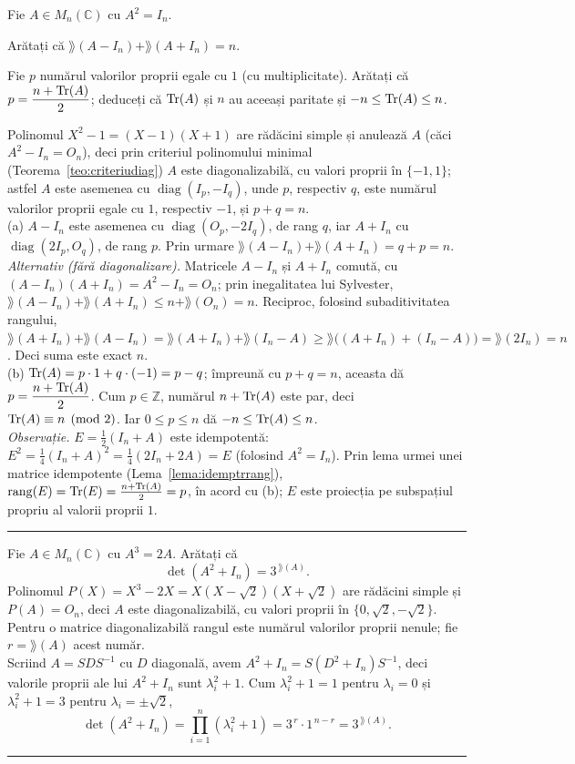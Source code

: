 Fie $A\in M_n(\mathbb{C})$ cu $A^2=I_n$.
\begin{parti}
  \item Arătați că $\rang(A-I_n)+\rang(A+I_n)=n$.
  \item Fie $p$ numărul valorilor proprii egale cu $1$ (cu multiplicitate). Arătați că $p=\dfrac{n+\operatorname{Tr}(A)}{2}$; deduceți că $\operatorname{Tr}(A)$ și $n$ au aceeași paritate și $-n\le\operatorname{Tr}(A)\le n$.
\end{parti}
\sol Polinomul $X^2-1=(X-1)(X+1)$ are rădăcini simple și anulează $A$ (căci $A^2-I_n=O_n$), deci prin criteriul polinomului minimal (Teorema~\ref{teo:criteriudiag}) $A$ este diagonalizabilă, cu valori proprii în $\{-1,1\}$; astfel $A$ este asemenea cu $\operatorname{diag}(I_p,-I_q)$, unde $p$, respectiv $q$, este numărul valorilor proprii egale cu $1$, respectiv $-1$, și $p+q=n$.\\[2pt]
(a) $A-I_n$ este asemenea cu $\operatorname{diag}(O_p,-2I_q)$, de rang $q$, iar $A+I_n$ cu $\operatorname{diag}(2I_p,O_q)$, de rang $p$. Prin urmare $\rang(A-I_n)+\rang(A+I_n)=q+p=n$.\\[2pt]
\emph{Alternativ (fără diagonalizare).} Matricele $A-I_n$ și $A+I_n$ comută, cu $(A-I_n)(A+I_n)=A^2-I_n=O_n$; prin inegalitatea lui Sylvester, $\rang(A-I_n)+\rang(A+I_n)\le n+\rang(O_n)=n$. Reciproc, folosind subaditivitatea rangului, $\rang(A+I_n)+\rang(A-I_n)=\rang(A+I_n)+\rang(I_n-A)\ge\rang\bigl((A+I_n)+(I_n-A)\bigr)=\rang(2I_n)=n$. Deci suma este exact $n$.\\[2pt]
(b) $\operatorname{Tr}(A)=p\cdot1+q\cdot(-1)=p-q$; împreună cu $p+q=n$, aceasta dă $p=\dfrac{n+\operatorname{Tr}(A)}{2}$. Cum $p\in\mathbb{Z}$, numărul $n+\operatorname{Tr}(A)$ este par, deci $\operatorname{Tr}(A)\equiv n\pmod2$. Iar $0\le p\le n$ dă $-n\le\operatorname{Tr}(A)\le n$.\\[2pt]
\emph{Observație.} $E=\tfrac12(I_n+A)$ este idempotentă: $E^2=\tfrac14(I_n+A)^2=\tfrac14(2I_n+2A)=E$ (folosind $A^2=I_n$). Prin lema urmei unei matrice idempotente (Lema~\ref{lema:idemptrrang}), $\operatorname{rang}(E)=\operatorname{Tr}(E)=\tfrac{n+\operatorname{Tr}(A)}{2}=p$, în acord cu (b); $E$ este proiecția pe subspațiul propriu al valorii proprii $1$.
\vspace{1mm}\hrule

Fie $A\in M_n(\mathbb{C})$ cu $A^3=2A$. Arătați că
\[ \det(A^2+I_n)=3^{\,\rang(A)}. \]
\sol Polinomul $P(X)=X^3-2X=X(X-\sqrt2)(X+\sqrt2)$ are rădăcini simple și $P(A)=O_n$, deci $A$ este diagonalizabilă, cu valori proprii în $\{0,\sqrt2,-\sqrt2\}$. Pentru o matrice diagonalizabilă rangul este numărul valorilor proprii nenule; fie $r=\rang(A)$ acest număr.\\[2pt]
Scriind $A=SDS^{-1}$ cu $D$ diagonală, avem $A^2+I_n=S(D^2+I_n)S^{-1}$, deci valorile proprii ale lui $A^2+I_n$ sunt $\lambda_i^2+1$. Cum $\lambda_i^2+1=1$ pentru $\lambda_i=0$ și $\lambda_i^2+1=3$ pentru $\lambda_i=\pm\sqrt2$,
\[ \det(A^2+I_n)=\prod_{i=1}^n(\lambda_i^2+1)=3^{\,r}\cdot1^{\,n-r}=3^{\,\rang(A)}. \]
\vspace{1mm}\hrule

